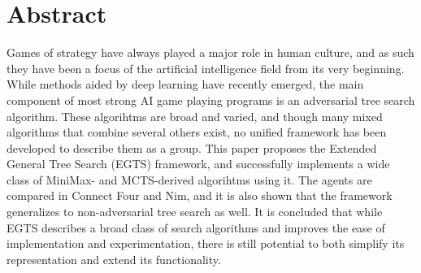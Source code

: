 \section*{Abstract}

Games of strategy have always played a major role in human culture, and as such they have been a focus of the artificial intelligence field from its very beginning. While methods aided by deep learning have recently emerged, the main component of most strong AI game playing programs is an adversarial tree search algorithm. These algorihtms are broad and varied, and though many mixed algorithms that combine several others exist, no unified framework has been developed to describe them as a group. This paper proposes the Extended General Tree Search (EGTS) framework, and successfully implements a wide class of MiniMax- and MCTS-derived algorihtms using it. The agents are compared in Connect Four and Nim, and it is also shown that the framework generalizes to non-adversarial tree search as well. It is concluded that while EGTS describes a broad class of search algorithms and improves the ease of implementation and experimentation, there is still potential to both simplify its representation and extend its functionality.